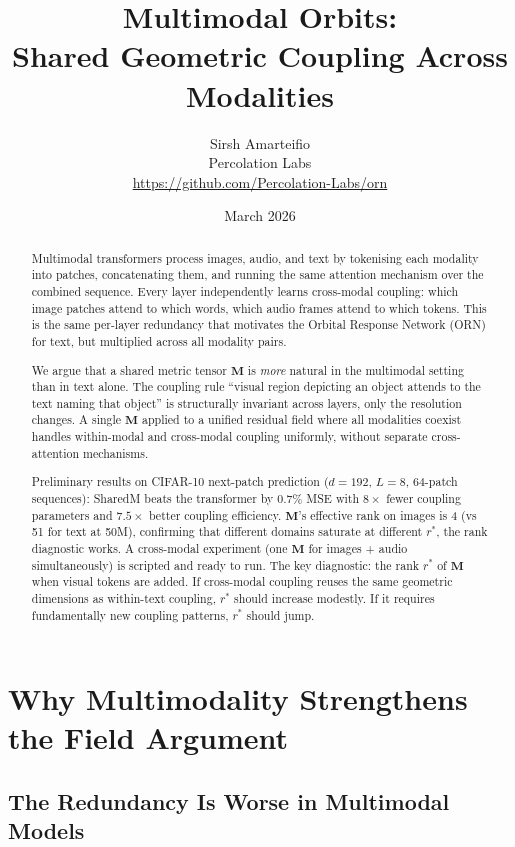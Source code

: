 \documentclass[11pt, a4paper]{article}
\title{%
    \textbf{Multimodal Orbits:}\\[4pt]
    \Large Shared Geometric Coupling Across Modalities%
}
\author{%
    Sirsh Amarteifio\\
    {\small Percolation Labs}\\
    {\small \url{https://github.com/Percolation-Labs/orn}}%
}
\date{March 2026 \quad{\small\textnormal{,  Draft with M2, MAESTRO, frozen-M results}}}
\newcommand{\M}{\mathbf{M}}
\theoremstyle{plain}
\theoremstyle{remark}
\begin{document}
\maketitle

\begin{abstract}
Multimodal transformers process images, audio, and text by tokenising each modality into patches, concatenating them, and running the same attention mechanism over the combined sequence.
Every layer independently learns cross-modal coupling: which image patches attend to which words, which audio frames attend to which tokens.
This is the same per-layer redundancy that motivates the Orbital Response Network (ORN) for text, but multiplied across all modality pairs.

We argue that a shared metric tensor $\M$ is \emph{more} natural in the multimodal setting than in text alone.
The coupling rule ``visual region depicting an object attends to the text naming that object'' is structurally invariant across layers, only the resolution changes.
A single $\M$ applied to a unified residual field where all modalities coexist handles within-modal and cross-modal coupling uniformly, without separate cross-attention mechanisms.

Preliminary results on CIFAR-10 next-patch prediction ($d{=}192$, $L{=}8$, 64-patch sequences): SharedM beats the transformer by $0.7\%$ MSE with $8\times$ fewer coupling parameters and $7.5\times$ better coupling efficiency.
$\M$'s effective rank on images is 4 (vs 51 for text at 50M), confirming that different domains saturate at different $r^*$, the rank diagnostic works.
A cross-modal experiment (one $\M$ for images + audio simultaneously) is scripted and ready to run.
The key diagnostic: the rank $r^*$ of $\M$ when visual tokens are added.
If cross-modal coupling reuses the same geometric dimensions as within-text coupling, $r^*$ should increase modestly.
If it requires fundamentally new coupling patterns, $r^*$ should jump.
\end{abstract}

\section{Why Multimodality Strengthens the Field Argument}

\subsection{The Redundancy Is Worse in Multimodal Models}
\end{document}
